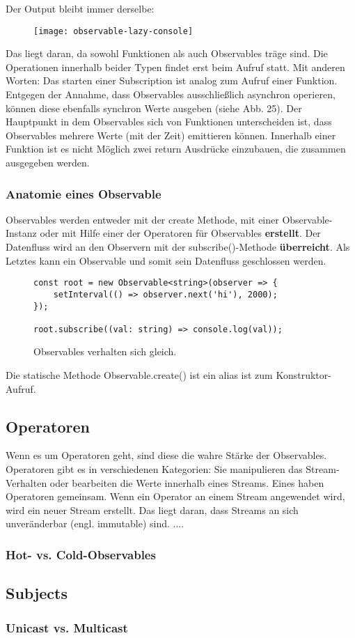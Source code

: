 \noindent
Der Output bleibt immer derselbe:
\begin{figure}[H]
\begin{center}
\texttt{[image: observable-lazy-console]}
\end{center}
\end{figure}

\noindent
Das liegt daran, da sowohl Funktionen als auch Observables träge sind. Die Operationen innerhalb beider Typen findet erst beim Aufruf statt. Mit anderen Worten: Das starten einer Subscription ist analog zum Aufruf einer Funktion. Entgegen der Annahme, dass Observables ausschließlich asynchron operieren, können diese ebenfalls synchron Werte ausgeben (siehe Abb. 25).
Der Hauptpunkt in dem Observables sich von Funktionen unterscheiden ist, dass Observables mehrere Werte (mit der Zeit) emittieren können. Innerhalb einer Funktion ist es nicht Möglich zwei return Ausdrücke einzubauen, die zusammen ausgegeben werden.

\subsubsection{Anatomie eines Observable}
Observables werden entweder mit der create Methode, mit einer Observable-Instanz oder mit Hilfe einer der Operatoren für Observables \textbf{erstellt}. Der Datenfluss wird an den Observern mit der subscribe()-Methode \textbf{überreicht}. Als Letztes kann ein Observable und somit sein Datenfluss geschlossen werden.

\begin{figure}[H]
\begin{lstlisting}[basicstyle=\small]
const root = new Observable<string>(observer => {
    setInterval(() => observer.next('hi'), 2000);
});

root.subscribe((val: string) => console.log(val));
\end{lstlisting}
\caption{Observables verhalten sich gleich.}
\end{figure}

\noindent
Die statische Methode Observable.create() ist ein alias ist zum Konstruktor-Aufruf.

\subsection{Operatoren}
Wenn es um Operatoren geht, sind diese die wahre Stärke der Observables. Operatoren gibt es in verschiedenen Kategorien: Sie manipulieren das Stream-Verhalten oder bearbeiten die Werte innerhalb eines Streams. Eines haben Operatoren gemeinsam. Wenn ein Operator an einem Stream angewendet wird, wird ein neuer Stream erstellt. Das liegt daran, dass Streams an sich unveränderbar (engl. immutable) sind. ....

\subsubsection{Hot- vs. Cold-Observables}
\subsection{Subjects}
\subsubsection{Unicast vs. Multicast}









